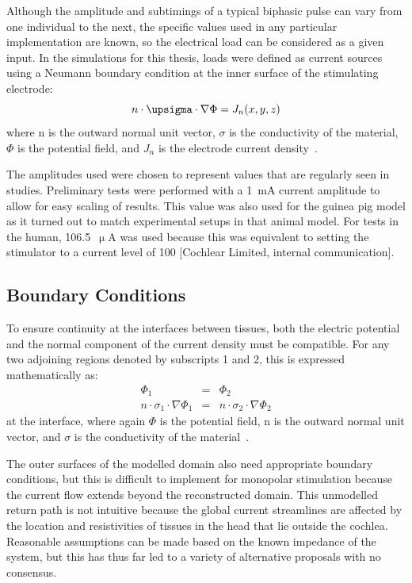 Although the amplitude and subtimings of a typical biphasic pulse can vary from
one individual to the next, the specific values used in any particular
implementation are known, so the electrical load can be considered as a given
input. In the simulations for this thesis, loads were defined as current sources
using a Neumann boundary condition at the inner surface of the stimulating
electrode:
\begin{equation}
	\centering
	n \cdot \upsigma \cdot \nabla \Phi = J_n (x,y,z)
\end{equation}
where n is the outward normal unit vector, $ \sigma $ is the conductivity of
the material, $ \Phi $ is the potential field, and $ J_n $ is the electrode
current density~\cite{miller1990}.

The amplitudes used were chosen to represent values that are regularly seen in
\invivo{} studies. Preliminary tests were performed with a 1~mA current
amplitude to allow for easy scaling of results. This value was also used for the
guinea pig model as it turned out to match experimental setups in that animal
model. For tests in the human, 106.5~$ \upmu $A was used because this
was equivalent to setting the stimulator to a current level of 100 [Cochlear
Limited, internal communication].

\subsection{Boundary Conditions}

To ensure continuity at the interfaces between tissues, both the electric
potential and the normal component of the current density must be compatible.
For any two adjoining regions denoted by subscripts 1 and 2, this is expressed
mathematically as:
\begin{eqnarray}
	\Phi_1 &=& \Phi_2
		\label{eqn:continuity_voltage} \\
	n \cdot \sigma_1 \cdot \nabla \Phi_1 &=& n \cdot \sigma_2 \cdot \nabla \Phi_2
		\label{eqn:continuity_current}
\end{eqnarray}
at the interface, where again $ \Phi $ is the potential field, n is the outward
normal unit vector, and $ \sigma $ is the conductivity of the
material~\cite{miller1990}.

The outer surfaces of the modelled domain also need appropriate boundary
conditions, but this is difficult to implement for monopolar stimulation because
the current flow extends beyond the reconstructed domain. This unmodelled return
path is not intuitive because the global current streamlines are affected by the
location and resistivities of tissues in the head that lie outside the cochlea.
Reasonable assumptions can be made based on the known impedance of the system,
but this has thus far led to a variety of alternative proposals with no
consensus.

